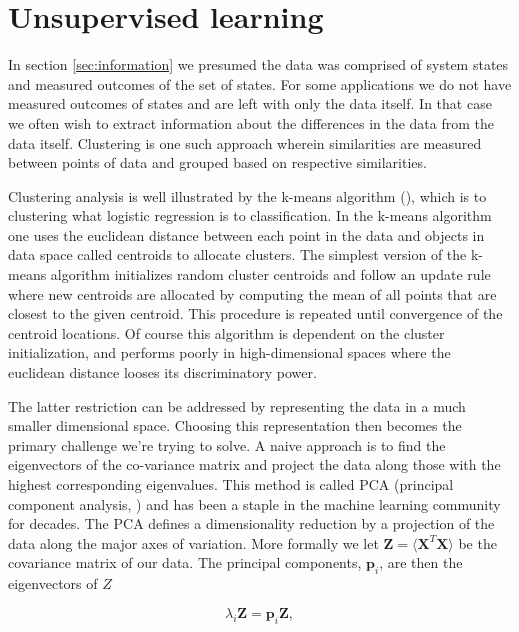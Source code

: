 \section{Unsupervised learning}\label{sec:unsupervised_learning}

In section \ref{sec:information} we presumed the data was comprised of system states and measured outcomes of the set of states. For some applications we do not have measured outcomes of states and are left with only the data itself. In that case we often wish to extract information about the differences in the data from the data itself. Clustering is one such approach wherein similarities are measured between points of data and grouped based on respective similarities.

Clustering analysis is well illustrated by the k-means algorithm (\cite{Neyman1967}), which is to clustering what logistic regression is to classification.  In the k-means algorithm one uses the euclidean distance between each point in the data and objects in data space called centroids to allocate clusters. The simplest version of the k-means algorithm initializes random cluster centroids and follow an update rule where new centroids are allocated by computing the mean of all points that are closest to the given centroid. This procedure is repeated until convergence of the centroid locations. Of course this algorithm is dependent on the cluster initialization, and performs poorly in high-dimensional spaces where the euclidean distance looses its discriminatory power. 

The latter restriction can be addressed by representing the data in a much smaller dimensional space. Choosing this representation then becomes the primary challenge we're trying to solve. A naive approach is to find the eigenvectors of the co-variance matrix and project the data along those with the highest corresponding eigenvalues. This method is called PCA (principal component analysis, \cite{Marsland2009}) and has been a staple in the machine learning community for decades. The PCA defines a dimensionality reduction by a projection of the data along the major axes of variation. More formally we let $\mathbf{Z} = \langle \mathbf{X}^T\mathbf{X}\rangle$ be the covariance matrix of our data. The principal components, $\mathbf{p}_i$, are then the eigenvectors of $Z$ 

\begin{equation}\label{eq:pca}
\lambda_i \mathbf{Z} = \mathbf{p}_i \mathbf{Z},
\end{equation}

